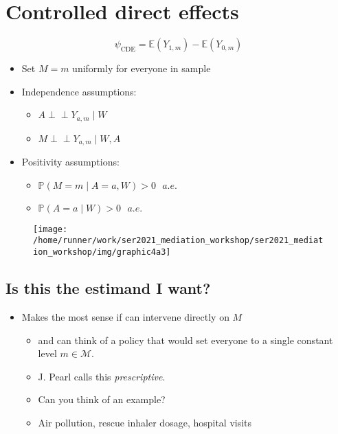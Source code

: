 \documentclass[
  12pt, krantz2,
]{book}
\providecommand{\tightlist}{%
  \setlength{\itemsep}{0pt}\setlength{\parskip}{0pt}}
\theoremstyle{definition}
\theoremstyle{definition}
\theoremstyle{definition}
\newcommand{\indep}{\mbox{$\perp\!\!\!\perp$}}
\renewcommand{\P}{\mathbb{P}}
\newcommand{\E}{\mathbb{E}}
\newcommand{\1}{\mathbbm{1}}
\begin{document}
\hypertarget{controlled-direct-effects}{%
\section*{Controlled direct effects}\label{controlled-direct-effects}}


\begin{equation*}
  \psi_{\text{CDE}} = \E(Y_{1,m}) - \E(Y_{0,m})
\end{equation*}

\begin{itemize}
\tightlist
\item
  Set \(M=m\) uniformly for everyone in sample
\item
  Independence assumptions:

  \begin{itemize}
  \tightlist
  \item
    \(A \indep Y_{a,m} \mid W\)
  \item
    \(M \indep Y_{a,m} \mid W, A\)
  \end{itemize}
\item
  Positivity assumptions:

  \begin{itemize}
  \tightlist
  \item
    \(\P(M = m \mid A=a, W) > 0 \text{  } a.e.\)
  \item
    \(\P(A=a \mid W) > 0 \text{  } a.e.\)
  \end{itemize}
\end{itemize}

\begin{figure}

{\centering \texttt{[image: /home/runner/work/ser2021\_mediation\_workshop/ser2021\_mediation\_workshop/img/graphic4a3]} 

}

\end{figure}

\hypertarget{is-this-the-estimand-i-want}{%
\subsection{Is this the estimand I want?}\label{is-this-the-estimand-i-want}}

\begin{itemize}
\tightlist
\item
  Makes the most sense if can intervene directly on \(M\)

  \begin{itemize}
  \tightlist
  \item
    and can think of a policy that would set everyone to a single constant
    level \(m \in \mathcal{M}\).
  \item
    J. Pearl calls this \emph{prescriptive}.
  \item
    Can you think of an example?
  \item
    Air pollution, rescue inhaler dosage, hospital visits
  \end{itemize}
\end{itemize}
\end{document}
